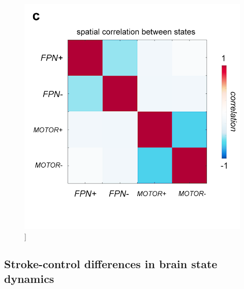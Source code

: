 \documentclass[phd,tocprelim]{cornell}
\renewcommand{\caption}[1]{\singlespacing\hangcaption{#1}\normalspacing}
\begin{document}
\begin{figure}[h!]
		\ContinuedFloat
		\captionsetup{labelformat=adja-page}
    \centering
    \includegraphics[width=1\textwidth]{chapter2/Figure2c.png}
    \caption[]{}
\end{figure}
\null
\vfill

    \subsection*{Stroke-control differences in brain state dynamics}
\end{document}
